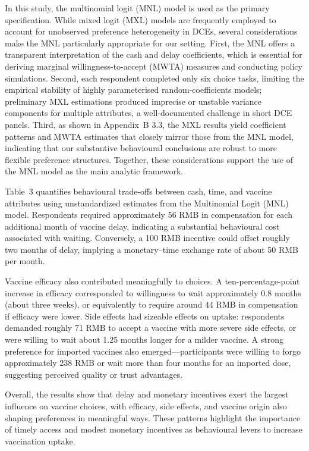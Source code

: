 \documentclass[12pt]{article}
\begin{document}
In this study, the multinomial logit (MNL) model is used as the primary specification. While 
mixed logit (MXL) models are frequently employed to account for unobserved preference 
heterogeneity in DCEs, several considerations make the MNL particularly appropriate for our 
setting. First, the MNL offers a transparent interpretation of the cash and delay coefficients, 
which is essential for deriving marginal willingness-to-accept (MWTA) measures and conducting 
policy simulations. Second, each respondent completed only six choice tasks, limiting the 
empirical stability of highly parameterised random-coefficients models; preliminary MXL 
estimations produced imprecise or unstable variance components for multiple attributes, a 
well-documented challenge in short DCE panels. Third, as shown in Appendix~B 3.3, the MXL results 
yield coefficient patterns and MWTA estimates that closely mirror those from the MNL model, 
indicating that our substantive behavioural conclusions are robust to more flexible 
preference structures. Together, these considerations support the use of the MNL model as the 
main analytic framework.


\clearpage

\clearpage

Table~3 quantifies behavioural trade-offs between cash, time, and vaccine attributes using 
unstandardized estimates from the Multinomial Logit (MNL) model. Respondents required 
approximately 56 RMB in compensation for each additional month of vaccine delay, indicating 
a substantial behavioural cost associated with waiting. Conversely, a 100 RMB incentive could 
offset roughly two months of delay, implying a monetary--time exchange rate of about 50 RMB 
per month.

Vaccine efficacy also contributed meaningfully to choices. A ten-percentage-point increase in 
efficacy corresponded to willingness to wait approximately 0.8 months (about three weeks), or 
equivalently to require around 44 RMB in compensation if efficacy were lower. Side effects 
had sizeable effects on uptake: respondents demanded roughly 71 RMB to accept a vaccine with 
more severe side effects, or were willing to wait about 1.25 months longer for a milder 
vaccine. A strong preference for imported vaccines also emerged—participants were willing to 
forgo approximately 238 RMB or wait more than four months for an imported dose, suggesting 
perceived quality or trust advantages.

Overall, the results show that delay and monetary incentives exert the largest influence on 
vaccine choices, with efficacy, side effects, and vaccine origin also shaping preferences in 
meaningful ways. These patterns highlight the importance of timely access and modest 
monetary incentives as behavioural levers to increase vaccination uptake.
\end{document}
